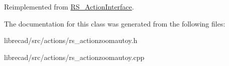 Reimplemented from \hyperlink{classRS__ActionInterface_aa2ba8f6f697f735eace4ec5449c0b8cd}{R\-S\-\_\-\-Action\-Interface}.



The documentation for this class was generated from the following files\-:\begin{DoxyCompactItemize}
\item 
librecad/src/actions/rs\-\_\-actionzoomautoy.\-h\item 
librecad/src/actions/rs\-\_\-actionzoomautoy.\-cpp\end{DoxyCompactItemize}
